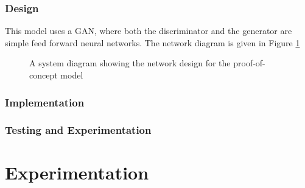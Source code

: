 \documentclass[10pt]{article}
\begin{document}
\subsubsection{Design}
This model uses a GAN, where both the discriminator and the generator are simple feed forward neural networks. The network diagram is given in Figure \ref{fig:toy_proj}

\begin{figure}[H]
\centering
\caption[System diagram for proof of concept model]{\label{fig:toy_proj} A system diagram showing the network design for the proof-of-concept model}
\end{figure}

\subsubsection{Implementation}

\subsubsection{Testing and Experimentation}
\section{Experimentation}

\newpage


\end{document}
